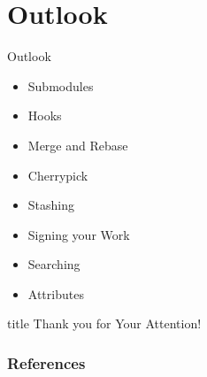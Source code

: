 \documentclass[aspectratio=169,fleqn]{beamer}
\begin{document}

\section{Outlook} %
\label{sec:outlook}

  \begin{frame}{Outlook}
    \begin{itemize}
      \item Submodules
      \item Hooks
      \item Merge and Rebase
      \item Cherrypick
      \item Stashing
      \item Signing your Work
      \item Searching
      \item Attributes
    \end{itemize}
  \end{frame}


\setcounter{backupcounter}{\value{framenumber}}

\begin{frame}[plain]
  \vfill
  \centering
  \begin{beamercolorbox}[sep=8pt,center,shadow=true,rounded=true]{title}
    Thank you for Your Attention!%
    \par%
  \end{beamercolorbox}
  \vfill
\end{frame}

\begin{frame}[plain]
  \frametitle{References}
  \AtNextBibliography{\tiny}
  \begin{multicols}{2}
    \nocite{*}
    \printbibliography
  \end{multicols}
\end{frame}

\setcounter{framenumber}{\value{backupcounter}}
\end{document}
